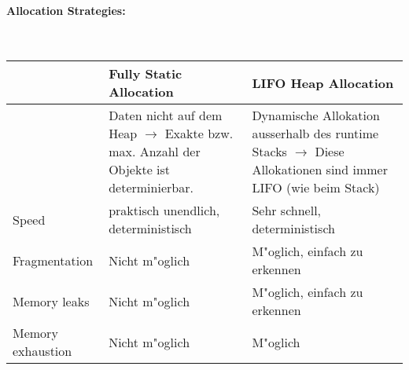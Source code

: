 \paragraph{Allocation Strategies: }~\\
\begin{tabular}{l||p{7cm}|p{7cm}|}
                        &  Fully Static Allocation & LIFO Heap Allocation\\
    \hline \hline
                        &   Daten nicht auf dem Heap $\rightarrow$ Exakte bzw. max. Anzahl der Objekte ist determinierbar. & Dynamische Allokation ausserhalb des runtime Stacks $\rightarrow$ Diese Allokationen sind immer LIFO (wie beim Stack)\\
    Speed               &   praktisch unendlich, deterministisch    & Sehr schnell, deterministisch \\
    Fragmentation       &   Nicht m"oglich                          & M"oglich, einfach zu erkennen\\
    Memory leaks        &   Nicht m"oglich                          & M"oglich, einfach zu erkennen\\
    Memory exhaustion   &   Nicht m"oglich                          & M"oglich\\
    
    
    
\end{tabular}

\vspace{1cm}

